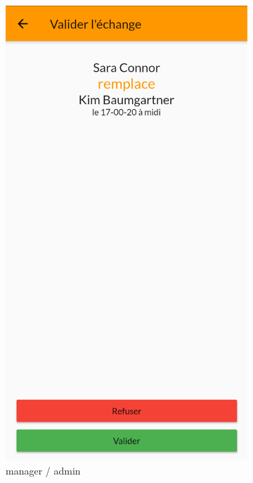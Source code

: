     \begin{figure}[!h]
        \centering
        \begin{subfigure}{.3\textwidth}
            \centering
            \includegraphics[width=0.9\linewidth]{screenshots/scenario_04/valider_manager.png}
            \caption{manager / admin}
            \label{fig:valider_manager}
        \end{subfigure}
        \begin{subfigure}{.3\textwidth}
            \centering

\end{subfigure}
\end{figure}
